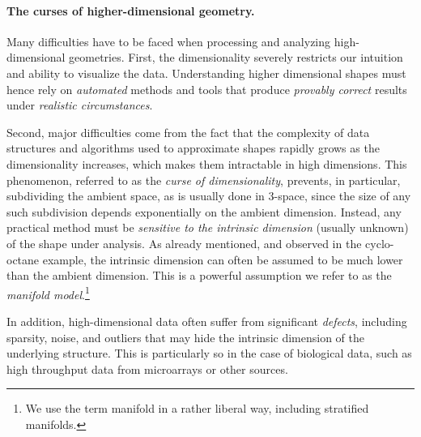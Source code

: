 \vspace{-3mm}

\paragraph{The curses of higher-dimensional geometry.} 
Many difficulties have to be faced when processing and analyzing
high-dimensional geometries. First, the dimensionality severely restricts our intuition and ability to visualize the data.  Understanding higher dimensional shapes must hence rely on {\em automated} methods and tools that produce {\em provably correct} results under {\em realistic circumstances}.

Second, major difficulties come from the fact that the complexity of
data structures and algorithms used to approximate shapes rapidly
grows as the dimensionality increases, which makes them intractable in
high dimensions.  This phenomenon, referred to as the {\em curse of
  dimensionality}, prevents,  in particular, subdividing  the ambient space, as is usually done in 3-space, since the size of any such subdivision depends exponentially on the ambient dimension. Instead, any practical method must be {\em sensitive to the intrinsic dimension} (usually unknown) of the shape under analysis. As already mentioned, and observed in the cyclo-octane example, the intrinsic dimension can often be assumed to be much lower than the ambient dimension. This is a powerful assumption we refer to as the {\em manifold model}.\footnote{We use the term manifold in a rather liberal way, including stratified manifolds.} %


In addition, high-dimensional data often suffer from significant {\em defects}, including sparsity, noise, and outliers that may hide the intrinsic dimension of the underlying structure. This is particularly so in the case of biological data, such as high throughput data from microarrays or other sources. %
\vspace{-3mm}

